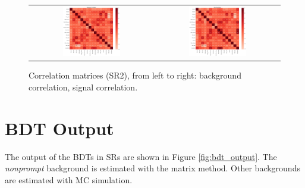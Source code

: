\begin{figure}[tbh!]
 \begin{center}
 \begin{tabular}{cc}
  \includegraphics[width=0.48\textwidth]{figures/Part3/BDT/corr_bkg_SR2}&
  \includegraphics[width=0.48\textwidth]{figures/Part3/BDT/corr_signal_SR2}\\
 \end{tabular}
 \caption{Correlation matrices (SR2), from left to right: background correlation, signal correlation.}
 \label{fig:Corr2}
 \end{center}
\end{figure}

\section{BDT Output}
\label{sec:Output}

The output of the \acp{BDT} in \acp{SR} are shown in Figure \ref{fig:bdt_output}. The \emph{nonprompt} background is estimated with the matrix method. Other backgrounds are estimated with \ac{MC} simulation.

